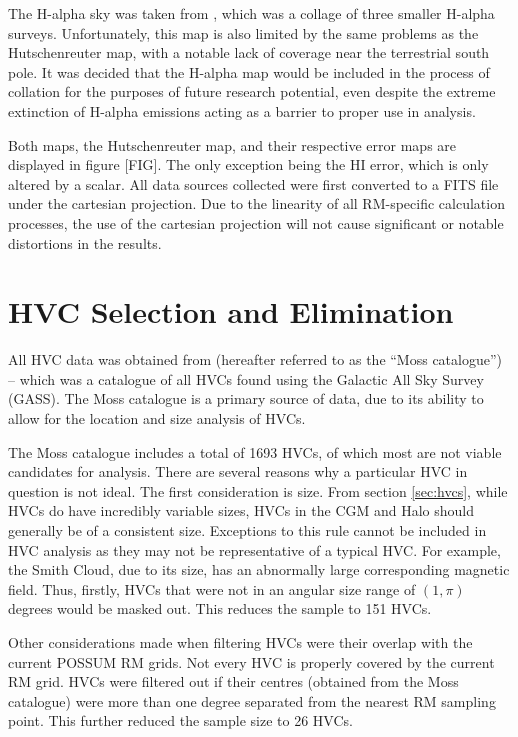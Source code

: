 The H-alpha sky was taken from \cite{ID43}, which was a collage of three smaller H-alpha surveys. Unfortunately, this map is also limited by the same problems as the Hutschenreuter map, with a notable lack of coverage near the terrestrial south pole. It was decided that the H-alpha map would be included in the process of collation for the purposes of future research potential, even despite the extreme extinction of H-alpha emissions acting as a barrier to proper use in analysis.


Both maps, the Hutschenreuter map, and their respective error maps are displayed in figure [FIG]. The only exception being the HI error, which is only altered by a scalar. All data sources collected were first converted to a FITS file under the cartesian projection. Due to the linearity of all RM-specific calculation processes, the use of the cartesian projection will not cause significant or notable distortions in the results.

\section{HVC Selection and Elimination}
\label{sec:hvc_sel}

All HVC data was obtained from \cite{ID3} (hereafter referred to as the “Moss catalogue”) – which was a catalogue of all HVCs found using the Galactic All Sky Survey (GASS). The Moss catalogue is a primary source of data, due to its ability to allow for the location and size analysis of HVCs.


The Moss catalogue includes a total of 1693 HVCs, of which most are not viable candidates for analysis. There are several reasons why a particular HVC in question is not ideal. The first consideration is size. From section \ref{sec:hvcs}, while HVCs do have incredibly variable sizes, HVCs in the CGM and Halo should generally be of a consistent size. Exceptions to this rule cannot be included in HVC analysis as they may not be representative of a typical HVC. For example, the Smith Cloud, due to its size, has an abnormally large corresponding magnetic field. Thus, firstly, HVCs that were not in an angular size range of $(1,\pi)$ degrees would be masked out. This reduces the sample to 151 HVCs.


Other considerations made when filtering HVCs were their overlap with the current POSSUM RM grids. Not every HVC is properly covered by the current RM grid. HVCs were filtered out if their centres (obtained from the Moss catalogue) were more than one degree separated from the nearest RM sampling point. This further reduced the sample size to 26 HVCs.


